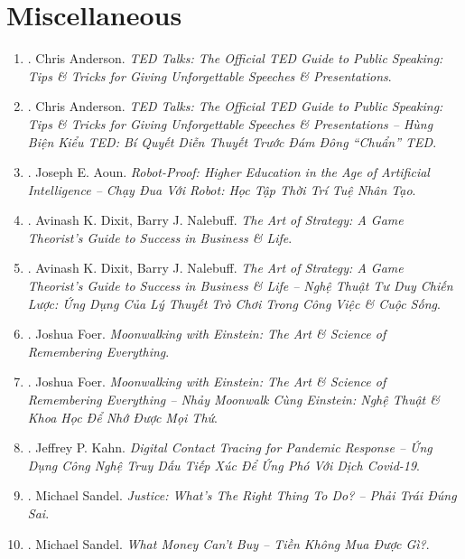 \documentclass{article}
\begin{document}

\section{Miscellaneous}

\begin{enumerate}
	\item \cite{Anderson2016}. Chris Anderson. \textit{TED Talks: The Official TED Guide to Public Speaking: Tips \& Tricks for Giving Unforgettable Speeches \& Presentations}.\hfill{\sf[reading]}
	\item \cite{Anderson2022}. Chris Anderson. \textit{TED Talks: The Official TED Guide to Public Speaking: Tips \& Tricks for Giving Unforgettable Speeches \& Presentations -- Hùng Biện Kiểu TED: Bí Quyết Diễn Thuyết Trước Đám Đông ``Chuẩn'' TED}.\hfill{\sf[done]}
	\item \cite{Aoun2019}. Joseph E. Aoun. \textit{Robot-Proof: Higher Education in the Age of Artificial Intelligence -- Chạy Đua Với Robot: Học Tập Thời Trí Tuệ Nhân Tạo}.\hfill{\sf[done]}
	\item \cite{Dixit_Nalebuff2010}. Avinash K. Dixit, Barry J. Nalebuff. \textit{The Art of Strategy: A Game Theorist's Guide to Success in Business \& Life}.
	\item \cite{Dixit_Nalebuff_strategy}. Avinash K. Dixit, Barry J. Nalebuff. \textit{The Art of Strategy: A Game Theorist's Guide to Success in Business \& Life -- Nghệ Thuật Tư Duy Chiến Lược: Ứng Dụng Của Lý Thuyết Trò Chơi Trong Công Việc \& Cuộc Sống}.\hfill{\sf[done]}
	\item \cite{Foer2012}. Joshua Foer. \textit{Moonwalking with Einstein: The Art \& Science of Remembering Everything}.\hfill{\sf[reading]}
	\item \cite{Foer_remember}. Joshua Foer. \textit{Moonwalking with Einstein: The Art \& Science of Remembering Everything -- Nhảy Moonwalk Cùng Einstein: Nghệ Thuật \& Khoa Học Để Nhớ Được Mọi Thứ}.\hfill{\sf[done]}
	\item \cite{Kahn2020}. Jeffrey P. Kahn. \textit{Digital Contact Tracing for Pandemic Response -- Ứng Dụng Công Nghệ Truy Dấu Tiếp Xúc Để Ứng Phó Với Dịch Covid-19}.\hfill{\sf[done]}
	\item \cite{Sandel_justice}. Michael Sandel. \textit{Justice: What's The Right Thing To Do? -- Phải Trái Đúng Sai}.\hfill{\sf[done]}
	\item \cite{Sandel_money}. Michael Sandel. \textit{What Money Can't Buy -- Tiền Không Mua Được Gì?}.\hfill{\sf[done]}

\end{enumerate}
\end{document}
